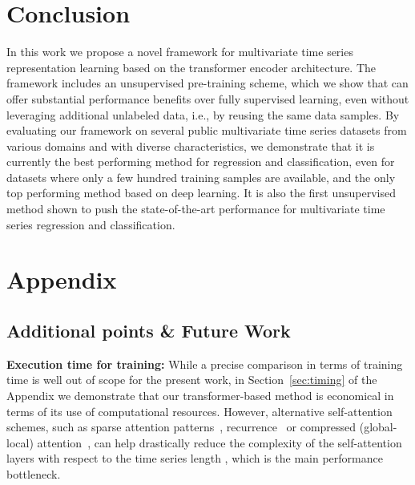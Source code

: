 \documentclass{article} \usepackage{iclr2021_conference,times}
\begin{document}
\section{Conclusion}

In this work we propose a novel framework for multivariate time series representation learning based on the transformer encoder architecture. The framework includes an unsupervised pre-training scheme, which we show that can offer substantial performance benefits over fully supervised learning, even without leveraging additional unlabeled data, i.e., by reusing the same data samples. By evaluating our framework on several public multivariate time series datasets from various domains and with diverse characteristics, we demonstrate that it is currently the best performing method for regression and classification, even for datasets where only a few hundred training samples are available, and the only top performing method based on deep learning. It is also the first unsupervised method shown to push the state-of-the-art performance for multivariate time series regression and classification.









\appendix
\section{Appendix}


\subsection{Additional points \& Future Work}

\textbf{Execution time for training:} While a precise comparison in terms of training time is well out of scope for the present work, in Section~\ref{sec:timing} of the Appendix we demonstrate that our transformer-based method is economical in terms of its use of computational resources. However, alternative self-attention schemes, such as sparse attention patterns~\citep{li2019enhancing}, recurrence~\citep{dai_transformer-xl_2019} or compressed (global-local) attention~\citep{beltagy_longformer_2020}, can help drastically reduce the  complexity of the self-attention layers with respect to the time series length , which is the main performance bottleneck.
\end{document}
